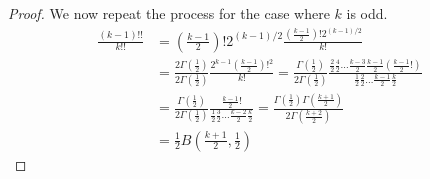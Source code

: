 \documentclass{article}
\begin{document}
\begin{proof}
	We now repeat the process for the case where $k$ is odd.
	\begin{align}
		\frac{(k-1)!!}{k!!} &= \left(\frac{k-1}{2}\right)!2^{(k-1)/2}\frac{(\frac{k-1}{2})!2^{(k-1)/2}}{k!} \\
		&= \frac{2\Gamma(\frac{1}{2})}{2\Gamma(\frac{1}{2})}\frac{2^{k-1}(\frac{k-1}{2})!^2}{k!} = \frac{\Gamma(\frac{1}{2})}{2\Gamma(\frac{1}{2})}\frac{\frac{2}{2}\frac{4}{2}\hdots\frac{k-3}{2}\frac{k-1}{2}(\frac{k-1}{2}!)}{\frac{1}{2}\frac{2}{2}\hdots\frac{k-1}{2}\frac{k}{2}} \\
		&= \frac{\Gamma(\frac{1}{2})}{2\Gamma(\frac{1}{2})}\frac{\frac{k-1}{2}!}{\frac{1}{2}\frac{3}{2}\hdots\frac{k-2}{2}\frac{k}{2}} = \frac{\Gamma(\frac{1}{2})\Gamma(\frac{k+1}{2})}{2\Gamma(\frac{k+2}{2})} \\
		&= \frac{1}{2}B\left(\frac{k+1}{2}, \frac{1}{2}\right)
	\end{align}
\end{proof}
\end{document}
